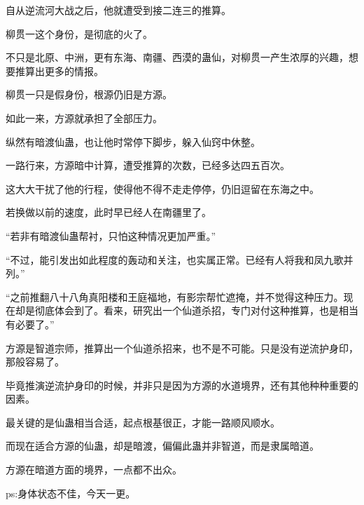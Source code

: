 \begin{this_body}
自从逆流河大战之后，他就遭受到接二连三的推算。

柳贯一这个身份，是彻底的火了。

不只是北原、中洲，更有东海、南疆、西漠的蛊仙，对柳贯一产生浓厚的兴趣，想要推算出更多的情报。

柳贯一只是假身份，根源仍旧是方源。

如此一来，方源就承担了全部压力。

纵然有暗渡仙蛊，也让他时常停下脚步，躲入仙窍中休整。

一路行来，方源暗中计算，遭受推算的次数，已经多达四五百次。

这大大干扰了他的行程，使得他不得不走走停停，仍旧逗留在东海之中。

若换做以前的速度，此时早已经人在南疆里了。

“若非有暗渡仙蛊帮衬，只怕这种情况更加严重。”

“不过，能引发出如此程度的轰动和关注，也实属正常。已经有人将我和凤九歌并列。”

“之前推翻八十八角真阳楼和王庭福地，有影宗帮忙遮掩，并不觉得这种压力。现在却是彻底体会到了。看来，研究出一个仙道杀招，专门对付这种推算，也是相当有必要了。”

方源是智道宗师，推算出一个仙道杀招来，也不是不可能。只是没有逆流护身印，那般容易了。

毕竟推演逆流护身印的时候，并非只是因为方源的水道境界，还有其他种种重要的因素。

最关键的是仙蛊相当合适，起点根基很正，才能一路顺风顺水。

而现在适合方源的仙蛊，却是暗渡，偏偏此蛊并非智道，而是隶属暗道。

方源在暗道方面的境界，一点都不出众。

ps:身体状态不佳，今天一更。

\end{this_body}

